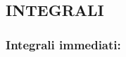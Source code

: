 \documentclass[a4paper, 9pt]{report}
\begin{document}
\subsection*{INTEGRALI}
\subsubsection*{Integrali immediati:}
\end{document}
